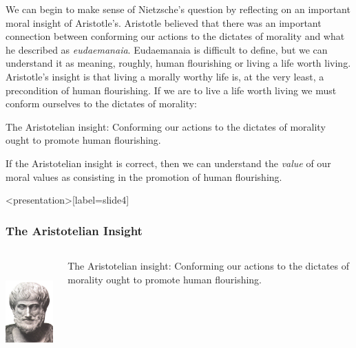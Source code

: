 We can begin to make sense of Nietzsche's question by reflecting on an important moral insight of Aristotle's. Aristotle believed that there was an important connection between conforming our actions to the dictates of morality and what he described as \emph{eudaemanaia}. Eudaemanaia is difficult to define, but we can understand it as meaning, roughly, human flourishing or living a life worth living. Aristotle's insight is that living a morally worthy life is, at the very least, a precondition of human flourishing. If we are to live a life worth living we must conform ourselves to the dictates of morality:
\begin{definition}\label{def:aristotle}
    The Aristotelian insight: Conforming our actions to the dictates of morality ought to promote human flourishing.
\end{definition}
If the Aristotelian insight is correct, then we can understand the \emph{value} of our moral values as consisting in the promotion of human flourishing. \change

\begin{frame}<presentation>[label=slide4]
    \frametitle{The Aristotelian Insight}
        \begin{columns}
            \begin{column}{3cm}
                \includegraphics[height=4cm]{../../graphics/aristotle.jpg}
            \end{column}
            \begin{column}{7cm}
                \alert{The Aristotelian insight:} Conforming our actions to the dictates of morality ought to promote human flourishing.
            \end{column}
        \end{columns}
\end{frame}

